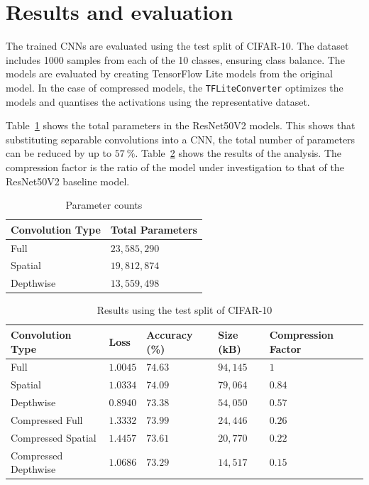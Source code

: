 \documentclass{article}
\begin{document}
	
	\section{Results and evaluation}
	
	The trained CNNs are evaluated using the test split of CIFAR-10. The dataset includes 1000 samples from each of the 10 classes, ensuring class balance. The models are evaluated by creating TensorFlow Lite models from the original model. In the case of compressed models, the \verb|TFLiteConverter| optimizes the models and quantises the activations using the representative dataset. 
	
	Table~\ref{tbl:params} shows the total parameters in the ResNet50V2 models. This shows that substituting separable convolutions into a CNN, the total number of parameters can be reduced by up to $57~\%$. Table~\ref{tbl:results} shows the results of the analysis. The compression factor is the ratio of the model under investigation to that of the ResNet50V2 baseline model.
	
	\begin{table}[h!]
		\caption{Parameter counts}
		\label{tbl:params}
		\centering
		\begin{tabular}{ll}
			\toprule
			Convolution Type & Total Parameters \\ \midrule
			Full             & $23,585,290$     \\
			Spatial          & $19,812,874$     \\
			Depthwise        & $13,559,498$     \\ \bottomrule
		\end{tabular}
	\end{table}
	
	\begin{table}[h!]
		\caption{Results using the test split of CIFAR-10}
		\label{tbl:results}
		\centering
		\begin{tabular}{lllll}
			\toprule
			Convolution Type     & Loss     & Accuracy (\%)    & Size (kB) & Compression Factor \\ \midrule
			Full                 & $1.0045$ & $74.63$          & $94,145$  & $1$                \\
			Spatial              & $1.0334$ & $74.09$          & $79,064$  & $0.84$             \\
			Depthwise            & $0.8940$ & $73.38$          & $54,050$  & $0.57$             \\
			Compressed Full      & $1.3332$ & $73.99$          & $24,446$  & $0.26$             \\
			Compressed Spatial   & $1.4457$ & $73.61$          & $20,770$  & $0.22$             \\
			Compressed Depthwise & $1.0686$ & $\mathbf{73.29}$ & $14,517$  & $\mathbf{0.15}$    \\ \bottomrule
		\end{tabular}
	\end{table}
\end{document}
